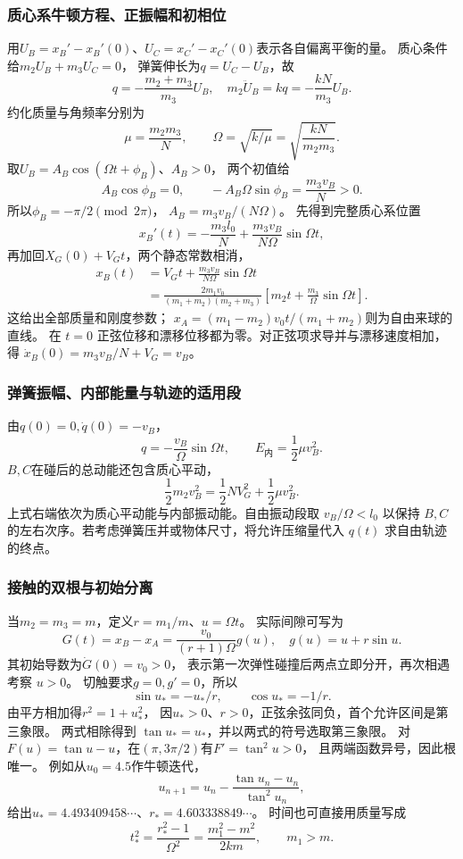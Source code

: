 \documentclass[UTF8,fontset=fandol,a4paper,11pt]{ctexart}
\begin{document}
\subsubsection*{质心系牛顿方程、正振幅和初相位}
用$U_B=x_B'-x_B'(0)$、$U_C=x_C'-x_C'(0)$表示各自偏离平衡的量。
质心条件给$m_2U_B+m_3U_C=0$，
弹簧伸长为$q=U_C-U_B$，故
\[
q=-\frac{m_2+m_3}{m_3}U_B,
\quad m_2\ddot U_B=kq=-\frac{kN}{m_3}U_B.
\]
约化质量与角频率分别为
\[
\mu=\frac{m_2m_3}{N},\qquad
\Omega=\sqrt{k/\mu}=\sqrt{\frac{kN}{m_2m_3}}.
\]
取$U_B=A_B\cos(\Omega t+\phi_B)$、$A_B>0$，
两个初值给
\[
A_B\cos\phi_B=0,\qquad
-A_B\Omega\sin\phi_B=\frac{m_3v_B}{N}>0.
\]
所以$\phi_B=-\pi/2\pmod{2\pi}$，
$A_B=m_3v_B/(N\Omega)$。
先得到完整质心系位置
\[
x_B'(t)=-\frac{m_3l_0}{N}
+\frac{m_3v_B}{N\Omega}\sin\Omega t,
\]
再加回$X_G(0)+V_Gt$，两个静态常数相消，
\[
\begin{aligned}
x_B(t)&=V_Gt+\frac{m_3v_B}{N\Omega}\sin\Omega t\\
&=\frac{2m_1v_0}{(m_1+m_2)(m_2+m_3)}
\left[m_2t+\frac{m_3}{\Omega}\sin\Omega t\right].
\end{aligned}
\]
这给出全部质量和刚度参数；
$x_A=(m_1-m_2)v_0t/(m_1+m_2)$则为自由来球的直线。
在 $t=0$ 正弦位移和漂移位移都为零。对正弦项求导并与漂移速度相加，得 $\dot x_B(0)=m_3v_B/N+V_G=v_B$。

\subsubsection*{弹簧振幅、内部能量与轨迹的适用段}
由$q(0)=0,\dot q(0)=-v_B$，
\[
q=-\frac{v_B}{\Omega}\sin\Omega t,
\qquad E_{\text{内}}=\frac12\mu v_B^2.
\]
$B,C$在碰后的总动能还包含质心平动，
\[
\frac12m_2v_B^2=\frac12NV_G^2+\frac12\mu v_B^2.
\]
上式右端依次为质心平动能与内部振动能。自由振动段取 $v_B/\Omega<l_0$ 以保持 $B,C$ 的左右次序。若考虑弹簧压并或物体尺寸，将允许压缩量代入 $q(t)$ 求自由轨迹的终点。

\subsubsection*{接触的双根与初始分离}
当$m_2=m_3=m$，定义$r=m_1/m$、$u=\Omega t$。
实际间隙可写为
\[
G(t)=x_B-x_A=\frac{v_0}{(r+1)\Omega}g(u),
\quad g(u)=u+r\sin u.
\]
其初始导数为$\dot G(0)=v_0>0$，
表示第一次弹性碰撞后两点立即分开，再次相遇考察 $u>0$。
切触要求$g=0,g'=0$，所以
\[
\sin u_*=-u_*/r,\qquad\cos u_*=-1/r.
\]
由平方相加得$r^2=1+u_*^2$，
因$u_*>0$、$r>0$，正弦余弦同负，首个允许区间是第三象限。
两式相除得到 $\tan u_*=u_*$，并以两式的符号选取第三象限。
对$F(u)=\tan u-u$，在$(\pi,3\pi/2)$有$F'=\tan^2u>0$，
且两端函数异号，因此根唯一。
例如从$u_0=4.5$作牛顿迭代，
\[
u_{n+1}=u_n-\frac{\tan u_n-u_n}{\tan^2u_n},
\]
给出$u_*=4.493409458\cdots$、$r_*=4.603338849\cdots$。
时间也可直接用质量写成
\[
t_*^2=\frac{r_*^2-1}{\Omega^2}
=\frac{m_1^2-m^2}{2km},\qquad m_1>m.
\]
\end{document}
